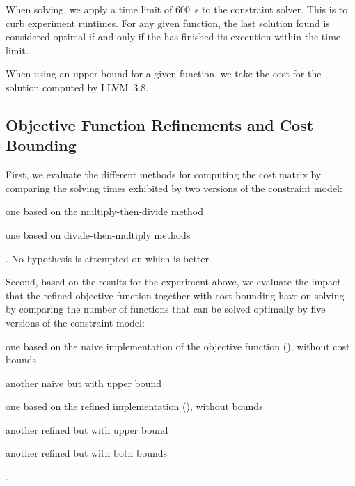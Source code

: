 When solving, we apply a time limit of \SI{600}{\s} to the \gls{constraint
  solver}.
%
This is to curb experiment runtimes.
%
For any given \gls{function}, the last \gls{solution} found is considered
optimal if and only if the  has finished its
execution within the time limit.

When using an upper bound for a given \gls{function}, we take the cost for the
\gls{solution} computed by \mbox{\gls{LLVM} 3.8}.


\subsection{Objective Function Refinements and Cost Bounding}

First, we evaluate the different methods for computing the cost matrix by
comparing the solving times exhibited by two versions of the \gls{constraint
  model}:
%
\begin{modelList}
  \item {}
    one based on the \gls{multiply-then-divide method}
  \item {}
    one based on \glspl{divide-then-multiply method}
\end{modelList}.
%
No hypothesis is attempted on which  is better.

Second, based on the results for the experiment above, we evaluate the impact
that the refined \gls{objective function} together with cost bounding have on
solving by comparing the number of \glspl{function} that can be solved optimally
by five versions of the \gls{constraint model}:
%
\begin{modelList}[resume]
  \item {}
    one based on the naive implementation of the \gls{objective function}
    (), without cost bounds
  \item {}
    another naive  but with upper bound
  \item {}
    one based on the refined implementation
    (), without
    bounds
  \item {}
    another refined  but with upper bound
  \item {}
    another refined  but with both bounds
\end{modelList}.

